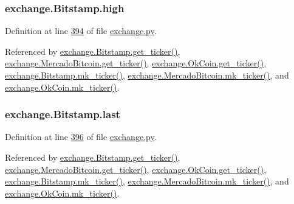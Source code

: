 \subsubsection[{\texorpdfstring{high}{high}}]{\setlength{\rightskip}{0pt plus 5cm}exchange.\+Bitstamp.\+high}\hypertarget{classexchange_1_1_bitstamp_a05de034d34b384373aeb26a28b60cad0}{}\label{classexchange_1_1_bitstamp_a05de034d34b384373aeb26a28b60cad0}


Definition at line \hyperlink{exchange_8py_source_l00394}{394} of file \hyperlink{exchange_8py_source}{exchange.\+py}.



Referenced by \hyperlink{exchange_8py_source_l00401}{exchange.\+Bitstamp.\+get\+\_\+ticker()}, \hyperlink{exchange_8py_source_l00535}{exchange.\+Mercado\+Bitcoin.\+get\+\_\+ticker()}, \hyperlink{exchange_8py_source_l00600}{exchange.\+Ok\+Coin.\+get\+\_\+ticker()}, \hyperlink{exchange_8py_source_l00415}{exchange.\+Bitstamp.\+mk\+\_\+ticker()}, \hyperlink{exchange_8py_source_l00549}{exchange.\+Mercado\+Bitcoin.\+mk\+\_\+ticker()}, and \hyperlink{exchange_8py_source_l00614}{exchange.\+Ok\+Coin.\+mk\+\_\+ticker()}.

\subsubsection[{\texorpdfstring{last}{last}}]{\setlength{\rightskip}{0pt plus 5cm}exchange.\+Bitstamp.\+last}\hypertarget{classexchange_1_1_bitstamp_acf669ec9b8b50638dc19dec5fd40ab04}{}\label{classexchange_1_1_bitstamp_acf669ec9b8b50638dc19dec5fd40ab04}


Definition at line \hyperlink{exchange_8py_source_l00396}{396} of file \hyperlink{exchange_8py_source}{exchange.\+py}.



Referenced by \hyperlink{exchange_8py_source_l00401}{exchange.\+Bitstamp.\+get\+\_\+ticker()}, \hyperlink{exchange_8py_source_l00535}{exchange.\+Mercado\+Bitcoin.\+get\+\_\+ticker()}, \hyperlink{exchange_8py_source_l00600}{exchange.\+Ok\+Coin.\+get\+\_\+ticker()}, \hyperlink{exchange_8py_source_l00415}{exchange.\+Bitstamp.\+mk\+\_\+ticker()}, \hyperlink{exchange_8py_source_l00549}{exchange.\+Mercado\+Bitcoin.\+mk\+\_\+ticker()}, and \hyperlink{exchange_8py_source_l00614}{exchange.\+Ok\+Coin.\+mk\+\_\+ticker()}.

